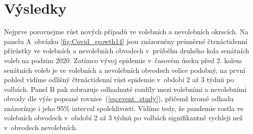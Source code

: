 \section*{Výsledky}
Nejprve porovnejme růst nových případů ve volebních a nevolebních okrscích. Na panelu A~obrázku \ref{fig:Covid_growth14}  jsou znázorněny průměrné čtrnáctidenní přírůstky ve volebních a nevolebních obvodech v~průběhu druhého kola senátních voleb na podzim 2020. Zatímco vývoj epidemie v~časovém úseku před 2. kolem senátních voleb
je ve volebních a nevolebních obvodech velice podobný, na první pohled vidíme odlišný čtrnáctidenní růst epidemie v~období 2 až 3 týdnů po volbách. Panel B pak zobrazuje odhadnuté rozdíly mezi volebními a nevolebními obvody dle výše popsané rovnice~(\ref{eq:event_study}),
přičemž kromě odhadu znázorňuje i jeho 95\% interval spolehlivosti. Vidíme tedy, že pandemie rostla ve volebních obvodech v~období 2 až 3 týdnů po volbách signifikantně rychleji než v~obvodech nevolebních. 


